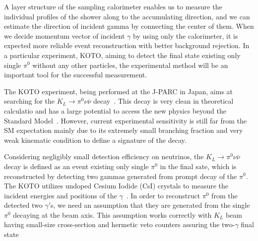 \documentclass[jkps,preprint,fleqn,showpacs,showkeys]{revtex4}
\begin{document}
A layer structure of the sampling calorimeter enables us to measure the individual profiles of the shower along to the accumulating direction, and we can estimate the direction of incident gamma by connecting the center of them. When we  decide momentum vector of incident $\gamma$ by using only the calorimeter, it is expected more reliable event reconstruction with better background rejection. In a particular experiment, KOTO, aiming to detect the final state existing only single $\pi^0$ without any other particles, the experimental method will be an important tool for the successful measurement.





The KOTO experiment, being performed at the J-PARC in Japan, aims at searching for the $K_L \rightarrow \pi^0 \nu \bar{\nu}$ decay~\cite{KOTOproposal}.  This decay is very clean in theoretical calculatio and has a large potential to access the new physics beyond the Standard Model~\cite{NewPhys}. However, current experimental sensitivity is still far from the SM expectation mainly due to its extremely small branching fraction and very weak kinematic condition to define a signature of the decay\cite{KOTO}. 

Considering negligibly small detection efficiency on neutrinos, the $K_L \rightarrow \pi^0 \nu \bar{\nu}$ decay is defined as an event existing only single $\pi^0$ in the final sate, which is reconstructed by detecting two gammas generated from prompt decay of the $\pi^0$. The KOTO utilizes undoped Cesium Iodide (CsI) crystals to measure the incident energies and positions of the $\gamma$~\cite{CsI}. %
In order to reconstruct $\pi^0$ from the detected two $\gamma '$s, we need an assumption that they are generated from the single $\pi^0$ decaying at the beam axis. This assumption works correctly with $K_L$ beam having small-size cross-section and hermetic veto counters assuring the two-$\gamma$ final state 
\end{document}
